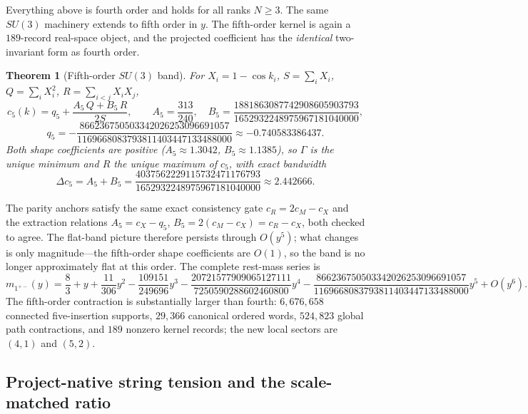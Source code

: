 \documentclass[11pt]{article}
\newtheorem{theorem}{Theorem}[section]
\begin{document}
Everything above is fourth order and holds for all ranks $N\geq3$. The same
$SU(3)$ machinery extends to fifth order in $y$. The fifth-order kernel is again a
$189$-record real-space object, and the projected coefficient has the
\emph{identical} two-invariant form as fourth order.

\begin{theorem}[Fifth-order $SU(3)$ band]\label{thm:fifth}
For $X_i=1-\cos k_i$, $S=\sum_iX_i$, $Q=\sum_iX_i^2$, $R=\sum_{i<j}X_iX_j$,
\[
c_5(k)=q_5+\frac{A_5\,Q+B_5\,R}{2S},
\qquad
A_5=\frac{313}{240},\quad
B_5=\frac{1881863087742908605903793}{1652932248975967181040000},
\]
\[
q_5=-\frac{866236750503342026253096691057}{1169668083793811403447133488000}
\approx-0.740583386437.
\]
Both shape coefficients are positive ($A_5\approx1.3042$, $B_5\approx1.1385$), so
$\Gamma$ is the unique minimum and $R$ the unique maximum of $c_5$, with exact
bandwidth
\[
\Delta c_5=A_5+B_5=\frac{4037562229115732471176793}{1652932248975967181040000}
\approx2.442666.
\]
\end{theorem}

The parity anchors satisfy the same exact consistency gate $c_R=2c_M-c_X$ and the
extraction relations $A_5=c_X-q_5$, $B_5=2(c_M-c_X)=c_R-c_X$, both checked to agree.
The flat-band picture therefore persists through $O(y^5)$; what changes is only
magnitude---the fifth-order shape coefficients are $O(1)$, so the band is no longer
approximately flat at this order. The complete rest-mass series is
\begin{equation}
m_{1^{+-}}(y)=\frac83+y+\frac{11}{306}y^2-\frac{109151}{249696}y^3
-\frac{20721577909065127111}{7250590288602460800}y^4
-\frac{866236750503342026253096691057}{1169668083793811403447133488000}y^5
+O(y^6).
\label{eq:restseries5}
\end{equation}
The fifth-order contraction is substantially larger than fourth: $6{,}676{,}658$
connected five-insertion supports, $29{,}366$ canonical ordered words, $524{,}823$
global path contractions, and $189$ nonzero kernel records; the new local sectors
are $(4,1)$ and $(5,2)$.

\subsection{Project-native string tension and the scale-matched ratio}
\label{sec:ratio}
\end{document}
